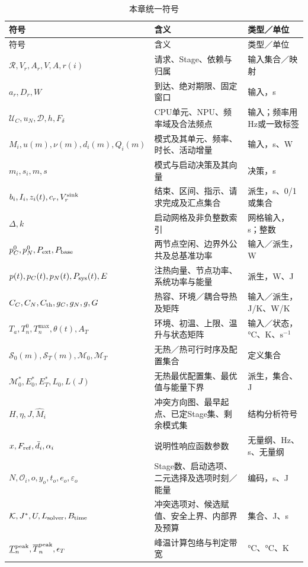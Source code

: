 \begin{longtable}{@{}p{5.8cm}p{5.3cm}p{2.7cm}@{}}
\caption{本章统一符号}\label{tab:symbols}\\
\toprule
符号 & 含义 & 类型／单位 \\
\midrule
\endfirsthead
\toprule
符号 & 含义 & 类型／单位 \\
\midrule
\endhead
\(\mathcal R,V_r,A_r,V,A,r(i)\) & 请求、Stage、依赖与归属 & 输入集合／映射 \\
\(a_r,D_r,W\) & 到达、绝对期限、固定窗口 & 输入，s \\
\(\mathcal U_C,u_N,\mathcal D,h,F_\delta\) & CPU单元、NPU、频率域及合法频点 & 输入；频率用Hz或一致标签 \\
\(M_i,u(m),\nu(m),d_i(m),Q_i(m)\) & 模式及其单元、频率、时长、活动增量 & 输入，s、W \\
\(m_i,s_i,m,s\) & 模式与启动决策及其向量 & 决策，s \\
\(b_i,I_i,z_i(t),c_r,V_r^{\rm sink}\) & 结束、区间、指示、请求完成及汇点集合 & 派生，s、0/1或集合 \\
\(\Delta,k\) & 启动网格及非负整数索引 & 网格输入，s；整数 \\
\(p_C^0,p_N^0,P_{\rm ext},P_{\rm base}\) & 两节点空闲、边界外公共及总基准功率 & 输入／派生，W \\
\(p(t),p_C(t),p_N(t),P_{\rm sys}(t),E\) & 注热向量、节点功率、系统功率与能量 & 派生，W、J \\
\(C_C,C_N,C_{\rm th},g_C,g_N,g,G\) & 热容、环境／耦合导热及矩阵 & 输入／派生，J/K、W/K \\
\(T_a,T_n^0,T_n^{\max},\theta(t),A_T\) & 环境、初温、上限、温升与状态矩阵 & 输入／状态，°C、K、\(\mathrm{s}^{-1}\) \\
\(\mathcal S_0(m),\mathcal S_T(m),\mathcal M_0,\mathcal M_T\) & 无热／热可行时序及配置集合 & 定义集合 \\
\(\mathcal M_0^*,E_0^*,E_T^*,L_0,L(J)\) & 无热最优配置集、最优值与能量下界 & 派生，集合、J \\
\(H,\eta,J,\widehat M_i\) & 冲突方向图、最早起点、已定Stage集、剩余模式集 & 结构分析符号 \\
\(x,F_{\rm ref},\bar d_i,\alpha_i\) & 说明性响应函数参数 & 无量纲、Hz、s、无量纲 \\
\(N,\mathcal O_i,o,y_o,t_o,e_o,\varepsilon_o\) & Stage数、启动选项、二元选择及选项时刻／能量 & 编码，s、J \\
\(\mathcal K,J^*,U,L_{\rm solver},B_{\rm time}\) & 冲突选项对、候选赋值、安全上界、内部界及预算 & 集合、J、s \\
\(\underline T_n^{\rm peak},\overline T_n^{\rm peak},\epsilon_T\) & 峰温计算包络与判定带宽 & °C、°C、K \\
\bottomrule
\end{longtable}

